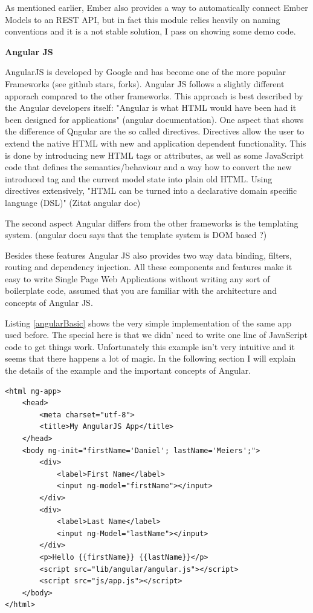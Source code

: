 As mentioned earlier, Ember also provides a way to automatically connect Ember Models to an REST API, but in fact this module relies heavily on naming conventions and it is a not stable solution, I pass on showing some demo code.


\textbf{Angular JS}  

AngularJS is developed by Google and has become one of the more popular Frameworks (see github stars, forks). Angular JS follows a slightly different apporach compared to the other frameworks. This approach is best described by the Angular developers itself: "Angular is what HTML would have been had it been designed for applications" (angular documentation). One aspect that shows the difference of Qngular are the so called directives. Directives allow the user to extend the native HTML with new and application dependent functionality.  This is done by introducing new HTML tags or attributes, as well as some JavaScript code that defines the semantics/behaviour and a way how to convert the new introduced tag and the current model state into plain old HTML.  %
Using directives extensively, "HTML can be turned into a declarative domain specific language (DSL)" (Zitat angular doc)
  
The second aspect Angular differs from the other frameworks is the templating system. (angular docu says that the template system is DOM based ?)   

Besides these features Angular JS also provides two way data binding, filters, routing and dependency injection. 
All these components and features make it easy to write Single Page Web Applications without writing any sort of boilerplate code, assumed that you are familiar with the architecture and concepts of Angular JS. 


Listing \ref{angularBasic} shows the very simple implementation of the same app used before. The special here is that we didn' need to write one line of JavaScript code to get things work. Unfortunately this example isn't very intuitive and it seems that there happens a lot of magic. In the following section I will explain the details of the example and the important concepts of Angular.

\begin{lstlisting}[label=angularBasic]
<html ng-app>
    <head>
        <meta charset="utf-8">
        <title>My AngularJS App</title>
    </head>
    <body ng-init="firstName='Daniel'; lastName='Meiers';">
        <div>
            <label>First Name</label> 
            <input ng-model="firstName"></input>
        </div>
        <div>
            <label>Last Name</label> 
            <input ng-Model="lastName"></input>
        </div>
        <p>Hello {{firstName}} {{lastName}}</p>
        <script src="lib/angular/angular.js"></script>
        <script src="js/app.js"></script>
    </body>
</html>
\end{lstlisting}


